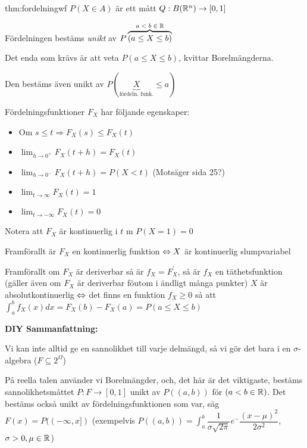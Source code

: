\par\bigskip
\begin{theo}[Fördelning]{thm:fordelningwf}
  $P(X\in A)$ är ett mått $Q:B(\mathbb{R}^n)\to[0,1]$
  \par\bigskip
  \noindent Fördelningen bestäms \textit{unikt} av $P\overbrace{(a\leq X\leq b)}^{\text{$a<b\in\mathbb{R}$}}$
  \par\bigskip
  \noindent Det enda som krävs är att veta $P(a\leq X\leq b)$, kvittar Borelmängderna.\par
  \noindent Den bestäms även unikt av $P(\underbrace{X}_{\text{fördeln. funk.}}\leq a)$
  \par\bigskip
  \noindent Fördelningsfunktioner $F_X$ har följande egenskaper:\par
  \begin{itemize}
    \item Om $s\leq t\Rightarrow F_X(s)\leq F_X(t)$
    \item $\lim_{h\to0^+}F_X(t+h) = F_X(t)$
    \item $\lim_{h\to0^-}F_X(t+h) = P(X<t)$ (Motsäger sida 25?)
    \item $\lim_{t\to\infty}F_X(t) = 1$
    \item $\lim_{t\to-\infty}F_X(t)=0$
  \end{itemize}\par
  \noindent Notera att $F_X$ är kontinuerlig i $t$ m $P(X=1)=0$\par
  \noindent Framförallt är $F_X$ en kontinuerlig funktion $\Leftrightarrow X$ är kontinuerlig slumpvariabel\par
  \noindent Framförallt om $F_X$ är deriverbar så är $f_X = F_X^{\prime}$, så är $f_X$ en täthetsfunktion (gäller även om $F_X$ är deriverbar föutom i ändligt många punkter)
  \noindent $X$ är absolutkontinuerlig $\Leftrightarrow $ det finns en funktion $f_X\geq0$ så att $\int_{a}^{b}f_X(x)dx = F_X(b)-F_X(a) = P(a\leq X\leq b)$
\end{theo}
\par\bigskip
\noindent\textbf{DIY Sammanfattning:}\par
\noindent Vi kan inte alltid ge en sannolikhet till varje delmängd, så vi gör det bara i en $\sigma$-algebra ($F\subseteq2^\Omega$)\par
\noindent På reella talen använder vi Borelmängder, och, det här är det viktigaste, bestäms sannolikhetsmåttet $P:F\to[0,1]$ unikt av $P((a,b))$ för $(a<b\in\mathbb{R})$. Det bestäms också unikt av fördelningsfunktionen som var, säg $F(x) = P((-\infty,x])$ (exempelvis $P((a,b)) = \int_{a}^{b}\dfrac{1}{\sigma\sqrt{2\pi}}e^-{\dfrac{(x-\mu)^2}{2\sigma^2}}$, $\sigma>0, \mu\in\mathbb{R}$)
